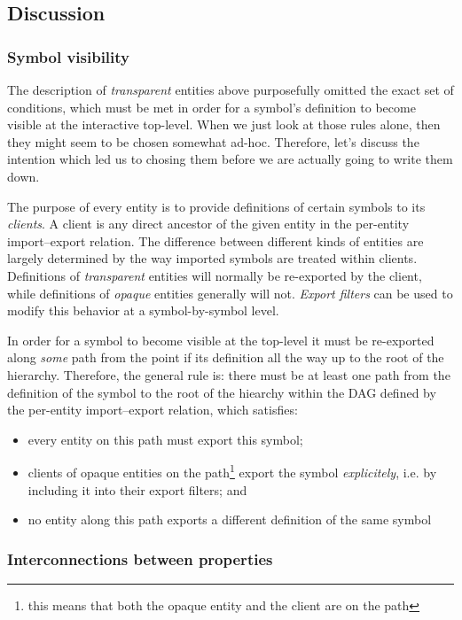 \subsection{Discussion}

\subsubsection*{Symbol visibility}

The description of {\em transparent} entities above purposefully omitted
the exact set of conditions, which must be met in order for a symbol's
definition to become visible at the interactive top-level.  When we just
look at those rules alone, then they might seem to be chosen somewhat
ad-hoc.  Therefore, let's discuss the intention which led us to chosing
them before we are actually going to write them down.

The purpose of every entity is to provide definitions of certain symbols to
its {\em clients}.  A client is any direct ancestor of the given entity in
the per-entity import--export relation.  The difference between different
kinds of entities are largely determined by the way imported symbols are
treated within clients.  Definitions of {\em transparent} entities will
normally be re-exported by the client, while definitions of {\em opaque}
entities generally will not.  {\em Export filters} can be used to modify
this behavior at a symbol-by-symbol level.

In order for a symbol to become visible at the top-level it must be
re-exported along {\em some} path from the point if its definition all the
way up to the root of the hierarchy.  Therefore, the general rule is: there
must be at least one path from the definition of the symbol to the root of
the hiearchy within the DAG defined by the per-entity import--export
relation, which satisfies:
\begin{itemize}
\item every entity on this path must export this symbol;
\item clients of opaque entities on the path\footnote{this means that both
the opaque entity and the client are on the path} export the symbol {\em
explicitely}, i.e. by including it into their export filters; and
\item no entity along this path exports a different definition of the same
symbol
\end{itemize}

\subsubsection*{Interconnections between properties}

